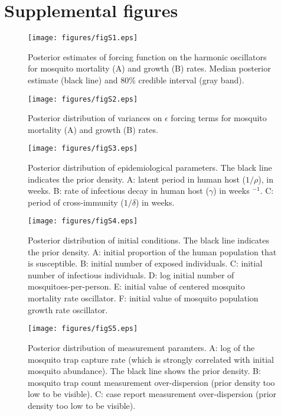 \documentclass[12pt,letterpaper]{article}
\begin{document}



\newpage

\section*{Supplemental figures}

\begin{figure}[!h]
\texttt{[image: figures/figS1.eps]}
\caption{
Posterior estimates of forcing function on the harmonic oscillators for mosquito mortality (A) and growth (B) rates.  Median posterior estimate (black line) and 80\% credible interval (gray band).
}
\end{figure}

\begin{figure}[!h]
\texttt{[image: figures/figS2.eps]}
\caption{
Posterior distribution of variances on $\epsilon$ forcing terms for mosquito mortality (A) and growth (B) rates.
}
\end{figure}

\begin{figure}[!h]
\texttt{[image: figures/figS3.eps]}
\caption{
Posterior distribution of epidemiological parameters.  The black line indicates the prior density. A: latent period in human host ($1/\rho$), in weeks. B: rate of infectious decay in human host ($\gamma$) in weeks $^{-1}$. C: period of cross-immunity ($1/\delta$) in weeks.
}
\end{figure}

\begin{figure}[!h]
\texttt{[image: figures/figS4.eps]}
\caption{Posterior distribution of initial conditions. The black line indicates the prior density. A: initial proportion of the human population that is susceptible. B: initial number of exposed individuals. C: initial number of infectious individuals. D: log initial number of mosquitoes-per-person. E: initial value of centered mosquito mortality rate oscillator. F: initial value of mosquito population growth rate oscillator.
}
\end{figure}

\begin{figure}[!h]
\texttt{[image: figures/figS5.eps]}
\caption{Posterior distribution of measurement paramters.  A: log of the mosquito trap capture rate (which is strongly correlated with initial mosquito abundance). The black line shows the prior density. B: mosquito trap count measurement over-dispersion (prior density too low to be visible). C: case report measurement over-dispersion (prior density too low to be visible).}
\end{figure}
\end{document}
